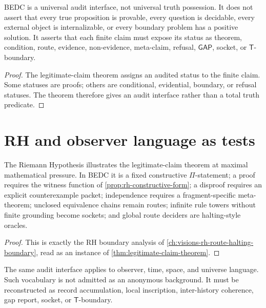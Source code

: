 \begin{corollary}
\label{cor:legitimate-claim-universal-audit-interface}
BEDC is a universal audit interface, not universal truth possession.  It
does not assert that every true proposition is provable, every question is
decidable, every external object is internalizable, or every boundary problem
has a positive solution.  It asserts that each finite claim must expose its
status as theorem, condition, route, evidence, non-evidence, meta-claim,
refusal, $\mathsf{GAP}$, socket, or $\mathsf{T}$-boundary.
\end{corollary}

\begin{proof}
The legitimate-claim theorem assigns an audited status to the finite claim.
Some statuses are proofs; others are conditional, evidential, boundary, or
refusal statuses.  The theorem therefore gives an audit interface rather
than a total truth predicate.
\end{proof}

\section{RH and observer language as tests}
\label{sec:legitimate-claim-tests}

\begin{corollary}
\label{cor:legitimate-claim-rh-test}
The Riemann Hypothesis illustrates the legitimate-claim theorem at maximal
mathematical pressure.  In BEDC it is a fixed constructive $\Pi$-statement;
a proof requires the witness function of
\autoref{prop:rh-constructive-form}; a disproof requires an explicit
counterexample packet; independence requires a fragment-specific
meta-theorem; unclosed equivalence chains remain routes; infinite rule
towers without finite grounding become sockets; and global route deciders
are halting-style oracles.
\end{corollary}

\begin{proof}
This is exactly the RH boundary analysis of
\autoref{ch:visions-rh-route-halting-boundary}, read as an instance of
\autoref{thm:legitimate-claim-theorem}.
\end{proof}

\begin{corollary}
\label{cor:legitimate-claim-observer-language}
The same audit interface applies to observer, time, space, and universe
language.  Such vocabulary is not admitted as an anonymous background.  It
must be reconstructed as record accumulation, local inscription,
inter-history coherence, gap report, socket, or $\mathsf{T}$-boundary.
\end{corollary}

